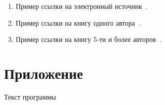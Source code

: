 \documentclass[14pt, oneside]{altsu-report}
\begin{document}
\begin{enumerate}
\item Пример ссылки на электронный источник~\cite{wikiRUBitbucket,wikiRUIdSoftware,wikiRUGitHub}.
\item Пример ссылки на книгу одного автора~\cite{book1author}.
\item Пример ссылки на книгу 5-ти и более авторов~\cite{book5author}.
\end{enumerate}

\newpage
{}
\printbibliography[title={Список использованной литературы}]

\appendix
\newpage
\chapter*{\raggedleft\label{appendix1}Приложение}

\begin{center}
\label{code:appendix}Текст программы
\end{center}

\begin{code}
\vspace{-1cm}\inputminted{C}{src/pi-mpi.c}
\end{code}
\end{document}
